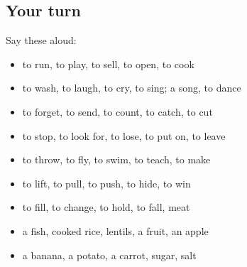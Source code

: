 \subsection*{Your turn}
Say these aloud:

\begin{itemize}
\raggedright
  \item to run, to play, to sell, to open, to cook
  \item to wash, to laugh, to cry, to sing; a song, to dance
  \item to forget, to send, to count, to catch, to cut
  \item to stop, to look for, to lose, to put on, to leave
  \item to throw, to fly, to swim, to teach, to make
  \item to lift, to pull, to push, to hide, to win
  \item to fill, to change, to hold, to fall, meat
  \item a fish, cooked rice, lentils, a fruit, an apple
  \item a banana, a potato, a carrot, sugar, salt
\end{itemize}


